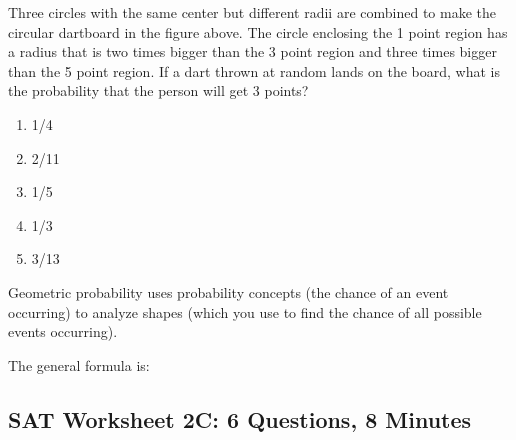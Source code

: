 \begin{multienumerate}
{Three circles with the same center but different radii are combined to make the circular dartboard in the figure above. The circle enclosing the 1 point region has a radius that is two times bigger than the 3 point region and three times bigger than the 5 point region. If a dart thrown at random lands on the board, what is the probability that the person will get 3 points?

\begin{enumerate}[label=(\Alph*)]
\item 1/4
\item 2/11
\item 1/5
\item 1/3
\item 3/13
\end{enumerate}}
\end{multienumerate}

\hrulefill

\bigskip
Geometric probability uses probability concepts (the chance of an event occurring) to analyze shapes (which you use to find the chance of all possible events occurring).

\bigskip
The general formula is:

\vfill
\pagebreak
\subsection{SAT Worksheet 2C: 6 Questions, 8 Minutes}

